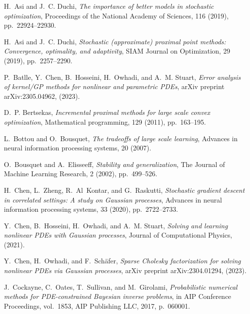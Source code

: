 \documentclass[10pt,reqno]{amsart}
\newcommand{\1}{{\chi}}
\numberwithin{equation}{section}
\theoremstyle{thmlemcorr}
\numberwithin{theorem}{section}
\theoremstyle{thmlemcorr*}
\theoremstyle{defi}
\theoremstyle{remexample}
\theoremstyle{ass}
\begin{document}
\clearpage

\begin{thebibliography}{10}
	
	{\sc H.~Asi and J.~C. Duchi}, {\em The importance of better models in
		stochastic optimization}, Proceedings of the National Academy of Sciences,
	116 (2019), pp.~22924--22930.
	
	{\sc H.~Asi and J.~C. Duchi}, {\em Stochastic (approximate) proximal point
		methods: Convergence, optimality, and adaptivity}, SIAM Journal on
	Optimization, 29 (2019), pp.~2257--2290.
	
	{\sc P.~Batlle, Y.~Chen, B.~Hosseini, H.~Owhadi, and A.~M. Stuart}, {\em Error
		analysis of kernel/{GP} methods for nonlinear and parametric {PDE}s}, arXiv
	preprint arXiv:2305.04962,  (2023).
	
	{\sc D.~P. Bertsekas}, {\em Incremental proximal methods for large scale convex
		optimization}, Mathematical programming, 129 (2011), pp.~163--195.
	
	{\sc L.~Bottou and O.~Bousquet}, {\em The tradeoffs of large scale learning},
	Advances in neural information processing systems, 20 (2007).
	
	{\sc O.~Bousquet and A.~Elisseeff}, {\em Stability and generalization}, The
	Journal of Machine Learning Research, 2 (2002), pp.~499--526.
	
	{\sc H.~Chen, L.~Zheng, R.~Al~Kontar, and G.~Raskutti}, {\em Stochastic
		gradient descent in correlated settings: A study on {G}aussian processes},
	Advances in neural information processing systems, 33 (2020), pp.~2722--2733.
	
	{\sc Y.~Chen, B.~Hosseini, H.~Owhadi, and A.~M. Stuart}, {\em Solving and
		learning nonlinear {PDE}s with {G}aussian processes}, Journal of
	Computational Physics,  (2021).
	
	{\sc Y.~Chen, H.~Owhadi, and F.~Sch{\"a}fer}, {\em Sparse {C}holesky
		factorization for solving nonlinear {PDE}s via {G}aussian processes}, arXiv
	preprint arXiv:2304.01294,  (2023).
	
	{\sc J.~Cockayne, C.~Oates, T.~Sullivan, and M.~Girolami}, {\em Probabilistic
		numerical methods for {PDE}-constrained {B}ayesian inverse problems}, in AIP
	Conference Proceedings, vol.~1853, AIP Publishing LLC, 2017, p.~060001.
	

\end{thebibliography}
\end{document}
